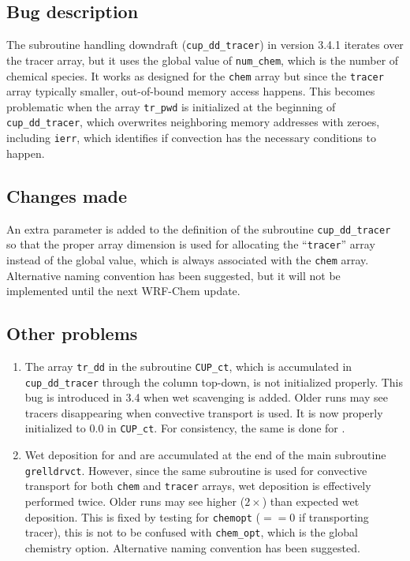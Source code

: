 \subsection{Bug description}\label{a-ssec:bug/ctrans/bug}
	The subroutine handling downdraft (\texttt{cup\_dd\_tracer}) in version 3.4.1 iterates over the tracer array, but it uses the global value of \texttt{num\_chem}, which is the number of chemical species. It works as designed for the \texttt{chem} array but since the \texttt{tracer} array typically smaller, out-of-bound memory access happens. This becomes problematic when the array \texttt{tr\_pwd} is initialized at the beginning of \texttt{cup\_dd\_tracer}, which overwrites neighboring memory addresses with zeroes, including \texttt{ierr}, which identifies if convection has the necessary conditions to happen.

\subsection{Changes made}\label{a-ssec:bug/ctrans/fix}
	An extra parameter is added to the definition of the subroutine \texttt{cup\_dd\_tracer} so that the proper array dimension is used for allocating the ``\texttt{tracer}'' array instead of the global value, which is always associated with the \texttt{chem} array. Alternative naming convention has been suggested, but it will not be implemented until the next WRF-Chem update.

\subsection{Other problems}\label{a-ssec:bug/ctrans/misc}
	\begin{enumerate}
		\item The array \texttt{tr\_dd} in the subroutine \texttt{CUP\_ct}, which is accumulated in \texttt{cup\_dd\_tracer} through the column top-down, is not initialized properly. This bug is introduced in 3.4 when wet scavenging is added. Older runs may see tracers disappearing when convective transport is used. It is now properly initialized to $0.0$ in \texttt{CUP\_ct}. For consistency, the same is done for .
		\item Wet deposition for  and  are accumulated at the end of the main subroutine \texttt{grelldrvct}. However, since the same subroutine is used for convective transport for both \texttt{chem} and \texttt{tracer} arrays, wet deposition is effectively performed twice. Older runs may see higher ($2\times$) than expected wet deposition. This is fixed by testing for \texttt{chemopt} ($==0$ if transporting tracer), this is not to be confused with \texttt{chem\_opt}, which is the global chemistry option. Alternative naming convention has been suggested.
	\end{enumerate}